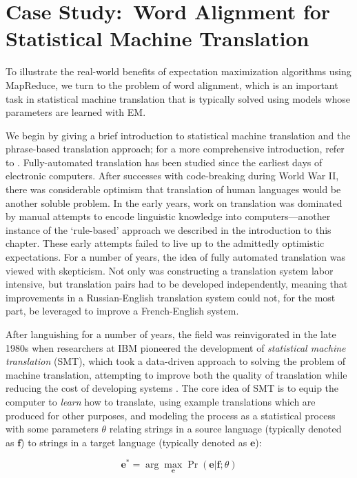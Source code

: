 \section{Case Study:\ Word Alignment for Statistical Machine Translation}
\label{chapter6_word_alignment}

To illustrate the real-world benefits of expectation maximization
algorithms using MapReduce, we turn to the problem of word alignment,
which is an important task in statistical machine translation that is
typically solved using models whose parameters are learned with EM.

We begin by giving a brief introduction to statistical machine
translation and the phrase-based translation approach; for a more
comprehensive introduction, refer to \cite{Koehn_2009,Lopez_2008}.
Fully-automated translation has been studied since the earliest days
of electronic computers.  After successes with code-breaking during
World War II, there was considerable optimism that translation of
human languages would be another soluble problem. In the early years,
work on translation was dominated by manual attempts to encode
linguistic knowledge into computers---another instance of the
`rule-based' approach we described in the introduction to this
chapter.  These early attempts failed to live up to the admittedly
optimistic expectations.  For a number of years, the idea of fully
automated translation was viewed with skepticism.  Not only was
constructing a translation system labor intensive, but translation
pairs had to be developed independently, meaning that improvements in
a Russian-English translation system could not, for the most part, be
leveraged to improve a French-English system.

After languishing for a number of years, the field was reinvigorated
in the late 1980s when researchers at IBM pioneered the development of
\emph{statistical machine translation} (SMT), which took a data-driven
approach to solving the problem of machine translation, attempting to
improve both the quality of translation while reducing the cost of
developing systems \cite{Brown_1993}.  The core idea of SMT is to
equip the computer to \emph{learn} how to translate, using example
translations which are produced for other purposes, and modeling the
process as a statistical process with some parameters $\theta$
relating strings in a source language (typically denoted as
$\textbf{f}$) to strings in a target language (typically denoted as
$\textbf{e}$):

\begin{equation}
\textbf{e}^* = \arg \max_{\textbf{e}} \Pr(\textbf{e} | \textbf{f} ; \theta)
\end{equation}


